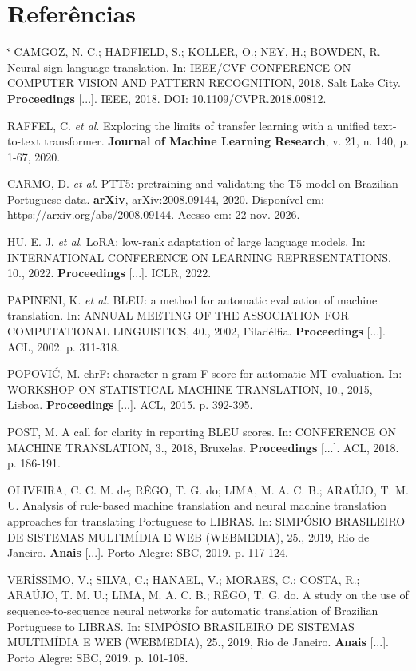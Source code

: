 \documentclass[12pt]{article}
\makeatletter
\renewenvironment{thebibliography}[1]
  {\section*{Referências}\footnotesize
   \list{\@biblabel{\@arabic\c@enumiv}}%
        {\settowidth\labelwidth{\@biblabel{#1}}\leftmargin\labelwidth
         \advance\leftmargin\labelsep\itemsep 3pt\usecounter{enumiv}%
         \let\p@enumiv\@empty\renewcommand\theenumiv{\@arabic\c@enumiv}}%
   \sloppy\clubpenalty4000\widowpenalty4000\sfcode`\.\@m}
  {\endlist}
\makeatother
\begin{document}
\begin{thebibliography}{99}
 CAMGOZ, N. C.; HADFIELD, S.; KOLLER, O.; NEY, H.; BOWDEN, R. Neural sign language translation. In: IEEE/CVF CONFERENCE ON COMPUTER VISION AND PATTERN RECOGNITION, 2018, Salt Lake City. \textbf{Proceedings} [...]. IEEE, 2018. DOI: 10.1109/CVPR.2018.00812.

 RAFFEL, C. \emph{et al}. Exploring the limits of transfer learning with a unified text-to-text transformer. \textbf{Journal of Machine Learning Research}, v. 21, n. 140, p. 1-67, 2020.

 CARMO, D. \emph{et al}. PTT5: pretraining and validating the T5 model on Brazilian Portuguese data. \textbf{arXiv}, arXiv:2008.09144, 2020. Disponível em: \url{https://arxiv.org/abs/2008.09144}. Acesso em: 22 nov. 2026.

 HU, E. J. \emph{et al}. LoRA: low-rank adaptation of large language models. In: INTERNATIONAL CONFERENCE ON LEARNING REPRESENTATIONS, 10., 2022. \textbf{Proceedings} [...]. ICLR, 2022.

 PAPINENI, K. \emph{et al}. BLEU: a method for automatic evaluation of machine translation. In: ANNUAL MEETING OF THE ASSOCIATION FOR COMPUTATIONAL LINGUISTICS, 40., 2002, Filadélfia. \textbf{Proceedings} [...]. ACL, 2002. p. 311-318.

 POPOVIĆ, M. chrF: character n-gram F-score for automatic MT evaluation. In: WORKSHOP ON STATISTICAL MACHINE TRANSLATION, 10., 2015, Lisboa. \textbf{Proceedings} [...]. ACL, 2015. p. 392-395.

 POST, M. A call for clarity in reporting BLEU scores. In: CONFERENCE ON MACHINE TRANSLATION, 3., 2018, Bruxelas. \textbf{Proceedings} [...]. ACL, 2018. p. 186-191.

 OLIVEIRA, C. C. M. de; RÊGO, T. G. do; LIMA, M. A. C. B.; ARAÚJO, T. M. U. Analysis of rule-based machine translation and neural machine translation approaches for translating Portuguese to LIBRAS. In: SIMPÓSIO BRASILEIRO DE SISTEMAS MULTIMÍDIA E WEB (WEBMEDIA), 25., 2019, Rio de Janeiro. \textbf{Anais} [...]. Porto Alegre: SBC, 2019. p. 117-124.

 VERÍSSIMO, V.; SILVA, C.; HANAEL, V.; MORAES, C.; COSTA, R.; ARAÚJO, T. M. U.; LIMA, M. A. C. B.; RÊGO, T. G. do. A study on the use of sequence-to-sequence neural networks for automatic translation of Brazilian Portuguese to LIBRAS. In: SIMPÓSIO BRASILEIRO DE SISTEMAS MULTIMÍDIA E WEB (WEBMEDIA), 25., 2019, Rio de Janeiro. \textbf{Anais} [...]. Porto Alegre: SBC, 2019. p. 101-108.


\end{thebibliography}
\end{document}
